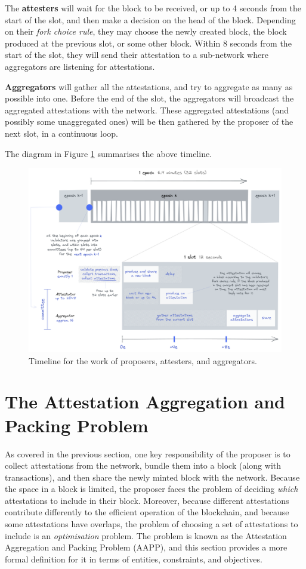 \documentclass{article}
\begin{document}
The \textbf{attesters} will wait for the block to be received, or up to 4
seconds from the start of the slot, and then make a decision on the head of the
block. Depending on their \emph{fork choice rule}, they may choose the newly
created block, the block produced at the previous slot, or some other block.  
Within 8 seconds from the start of the slot, they will send their attestation
to a sub-network where aggregators are listening for attestations.

\textbf{Aggregators} will gather all the attestations, and try to aggregate as
many as possible into one. Before the end of the slot,
the aggregators will broadcast the aggregated attestations with the network.  
These aggregated attestations (and possibly some unaggregated ones) will be
then gathered by the proposer of the next slot, in a continuous loop.

The diagram in Figure \ref{fig:timeline} summarises the above timeline.
%
\begin{figure}[!ht]
  \hspace*{-0.1\textwidth}
  \centering
  \includegraphics[width=1.2\textwidth]{timeline.png}
  \caption{Timeline for the work of proposers, attesters, and 
  aggregators.\label{fig:timeline}}
\end{figure}

\section{The Attestation Aggregation and Packing Problem}

As covered in the previous section, one key responsibility of the proposer is
to collect attestations from the network, bundle them into a block (along with
transactions), and then share the newly minted block with the network.  Because
the space in a block is limited, the proposer faces the problem of deciding
\emph{which} attestations to include in their block. Moreover, because
different attestations contribute differently to the efficient operation of the
blockchain, and because some attestations have overlaps, the problem of
choosing a set of attestations to include is an \emph{optimisation} problem.
The problem is known as the Attestation Aggregation and Packing Problem (AAPP),
and this section provides a more formal definition for it in terms of entities,
constraints, and objectives.
\end{document}
